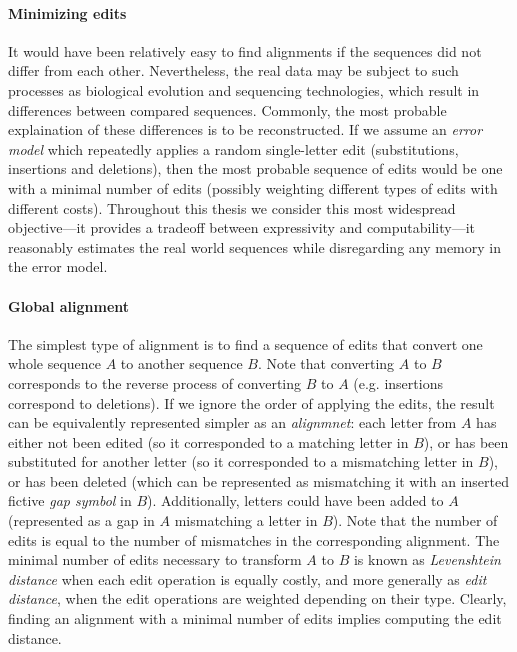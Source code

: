 
\paragraph{Minimizing edits}
It would have been relatively easy to find alignments if the sequences did not
differ from each other. Nevertheless, the real data may be subject to such
processes as biological evolution and sequencing technologies, which result in
differences between compared sequences. Commonly, the most probable explaination
of these differences is to be reconstructed. If we assume an \emph{error model}
which repeatedly applies a random single-letter edit (substitutions, insertions
and deletions), then the most probable sequence of edits would be one with a
minimal number of edits (possibly weighting different types of edits with
different costs). Throughout this thesis we consider this most widespread
objective---it provides a tradeoff between expressivity and computability---it
reasonably estimates the real world sequences while disregarding any memory in
the error model.

\paragraph{Global alignment}
The simplest type of alignment is to find a sequence of edits that convert one
whole sequence $A$ to another sequence $B$. Note that converting $A$ to $B$
corresponds to the reverse process of converting $B$ to $A$ (e.g. insertions
correspond to deletions). If we ignore the order of applying the edits, the
result can be equivalently represented simpler as an \emph{alignmnet}: each
letter from $A$ has either not been edited (so it corresponded to a matching
letter in $B$), or has been substituted for another letter (so it corresponded
to a mismatching letter in $B$), or has been deleted (which can be represented
as mismatching it with an inserted fictive \emph{gap symbol} in $B$).
Additionally, letters could have been added to $A$ (represented as a gap in $A$
mismatching a letter in $B$). Note that the number of edits is equal to the
number of mismatches in the corresponding alignment. The minimal number of edits
necessary to transform $A$ to $B$ is known as \emph{Levenshtein distance} when
each edit operation is equally costly, and more generally as \emph{edit
distance}, when the edit operations are weighted depending on their type.
Clearly, finding an alignment with a minimal number of edits implies computing
the edit distance.

